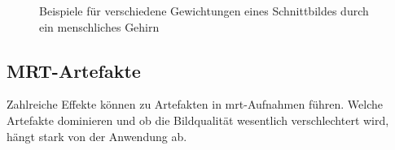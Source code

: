 \begin{figure}[H]
	\centering
	\hfill
	\hfill
	\caption[Beispiele für unterschiedlich gewichtete Spinecho-Aufnahmen]{Beispiele für verschiedene Gewichtungen eines Schnittbildes durch ein menschliches Gehirn \cite[S.~424ff]{Bushberg2011}}
	\label{fig:BildgewichtungenBsp}
\end{figure}





\subsection{MRT-Artefakte}
Zahlreiche Effekte können zu Artefakten in \gls{mrt}-Aufnahmen führen. Welche Artefakte dominieren und ob die Bildqualität wesentlich verschlechtert wird, hängt stark von der Anwendung ab.

